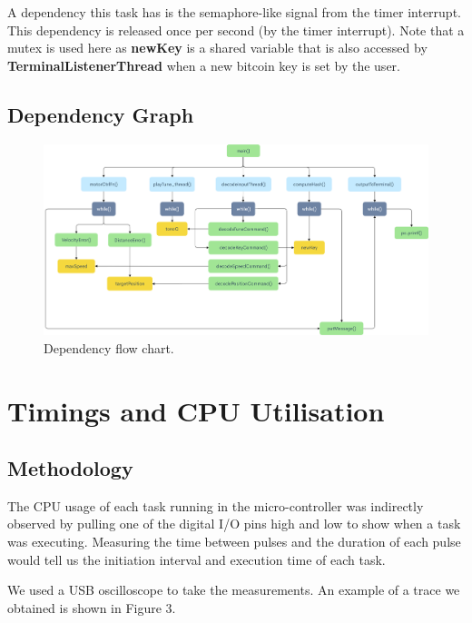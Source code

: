 \documentclass{article}
\begin{document}
\bigskip

\noindent
A dependency this task has is the semaphore-like signal from the timer interrupt. This dependency is released once per second (by the timer interrupt). Note that a mutex is used here as \textbf{newKey} is a shared variable that is also accessed by \textbf{TerminalListenerThread} when a new bitcoin key is set by the user.


\subsection{Dependency Graph}

\begin{figure}[H]
\begin{center}
   \includegraphics[width=0.9\linewidth]{dependency.png}
\end{center}
   \caption{Dependency flow chart.}
\label{fig:long}
\label{fig:onecol}
\end{figure}

\section{Timings and CPU Utilisation}
\subsection{Methodology}

\noindent
The CPU usage of each task running in the micro-controller was indirectly observed by pulling one of the digital I/O pins high and low to show when a task was executing. Measuring the time between pulses and the duration of each pulse would tell us the initiation interval and execution time of each task.

\bigskip

\noindent
We used a USB oscilloscope to take the measurements. An example of a trace we obtained is shown in Figure 3.
\end{document}
